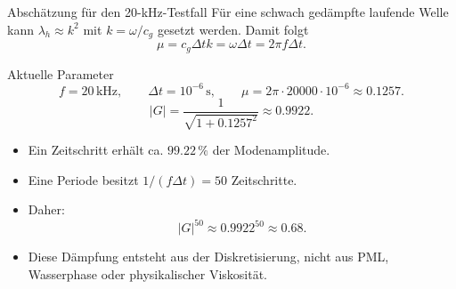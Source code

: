 \documentclass[
	german,%
	accentcolor=9c,%
	accept-missing-logos=true,%
]{tudabeamer}
\begin{document}
\begin{frame}{Abschätzung für den 20-kHz-Testfall}
    \scriptsize
    \setlength{\abovedisplayskip}{0.05cm}
    \setlength{\belowdisplayskip}{0.05cm}
    Für eine schwach gedämpfte laufende Welle kann $\lambda_h\approx k^2$ mit
    $k=\omega/c_g$ gesetzt werden. Damit folgt
    \[
        \mu=c_g\Delta t k=\omega\Delta t=2\pi f\Delta t .
    \]

    \begin{block}{Aktuelle Parameter}
        \[
            f=20\,\mathrm{kHz},
            \qquad
            \Delta t=10^{-6}\,\mathrm{s},
            \qquad
            \mu=2\pi\cdot 20000\cdot10^{-6}\approx0.1257 .
        \]
        \[
            |G|=\frac{1}{\sqrt{1+0.1257^2}}\approx0.9922 .
        \]
    \end{block}

    \begin{itemize}
        \setlength{\itemsep}{0.05cm}
        \item Ein Zeitschritt erhält ca. $99.22\,\%$ der Modenamplitude.
        \item Eine Periode besitzt $1/(f\Delta t)=50$ Zeitschritte.
        \item Daher:
        \[
            |G|^{50}\approx 0.9922^{50}\approx0.68 .
        \]
        \item Diese Dämpfung entsteht aus der Diskretisierung, nicht aus PML,
        Wasserphase oder physikalischer Viskosität.
    \end{itemize}
\end{frame}
\end{document}
